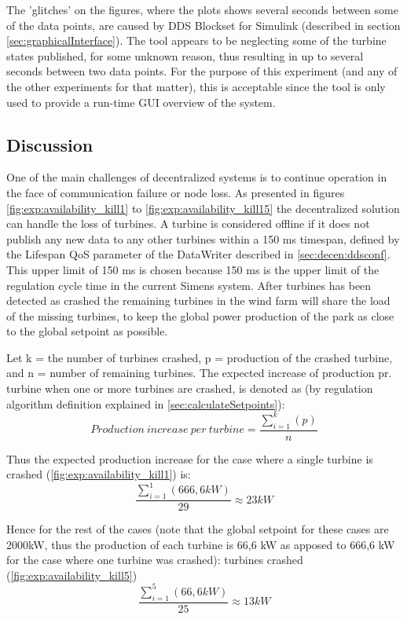The 'glitches' on the figures, where the plots shows several seconds between some of the data points, are caused by DDS Blockset for Simulink (described in section \cref{sec:graphicalInterface}). The tool appears to be neglecting some of the turbine states published, for some unknown reason, thus resulting in up to several seconds between two data points. For the purpose of this experiment (and any of the other experiments for that matter), this is acceptable since the tool is only used to provide a run-time GUI overview of the system.

\FloatBarrier
\subsection{Discussion}
One of the main challenges of decentralized systems is to continue operation in the face of communication failure or node loss. As presented in figures \ref{fig:exp:availability_kill1} to \ref{fig:exp:availability_kill15} the decentralized solution can handle the loss of turbines. A turbine is considered offline if it does not publish any new data to any other turbines within a 150 ms timespan, defined by the Lifespan QoS parameter of the DataWriter described in \cref{sec:decen:ddsconf}.
This upper limit of 150 ms is chosen because 150 ms is the upper limit of the regulation cycle time in the current Simens system.
After turbines has been detected as crashed the remaining turbines in the wind farm will share the load of the missing turbines, to keep the global power production of the park as close to the global setpoint as possible.

Let k = the number of turbines crashed, p = production of the crashed turbine, and n = number of remaining turbines. The expected increase of production pr. turbine when one or more turbines are crashed, is denoted as (by regulation algorithm definition explained in \cref{sec:calculateSetpoints}): $$Production~increase~per~turbine = \frac{\sum\limits_{i=1}^k(p)}{n}$$

Thus the expected production increase for the case where a single turbine is crashed (\cref{fig:exp:availability_kill1}) is: $$\frac{\sum\limits_{i=1}^1(666,6kW)}{29}\approx23kW$$

Hence for the rest of the cases (note that the global setpoint for these cases are 2000kW, thus the production of each turbine is 66,6 kW as apposed to 666,6 kW for the case where one turbine was crashed):
\newline\newline
{} turbines crashed (\cref{fig:exp:availability_kill5}) $$\frac{\sum\limits_{i=1}^5(66,6kW)}{25}\approx13kW$$

